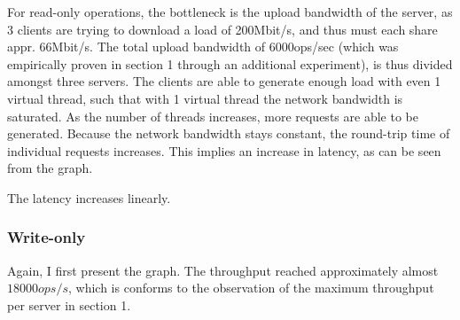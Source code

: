 \documentclass[11pt,a4paper]{article}
\begin{document}
For read-only operations, the bottleneck is the upload bandwidth of the server,
as 3 clients are trying to download a load of 200Mbit/s, and thus must each share appr. 66Mbit/s.
The total upload bandwidth of 6000ops/sec (which was empirically proven in section 1 through an additional experiment), is thus divided amongst  three servers.
The clients are able to generate enough load with even 1 virtual thread, such that with 1 virtual thread the network bandwidth is saturated.
As the number of threads increases, more requests are able to be generated.
Because the network bandwidth stays constant, the round-trip time of individual requests increases.
This implies an increase in latency, as can be seen from the graph.


The latency increases linearly.

\subsubsection{Write-only}
Again, I first present the graph.
The throughput reached approximately almost $18000ops/s$, which is conforms to the observation of the maximum throughput per server in section 1.
\end{document}
